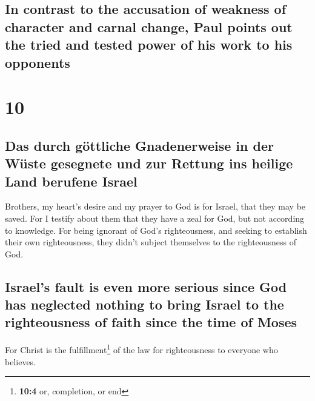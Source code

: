 \hypertarget{in-contrast-to-the-accusation-of-weakness-of-character-and-carnal-change-paul-points-out-the-tried-and-tested-power-of-his-work-to-his-opponents}{%
\subsection{In contrast to the accusation of weakness of character and
carnal change, Paul points out the tried and tested power of his work to
his
opponents}\label{in-contrast-to-the-accusation-of-weakness-of-character-and-carnal-change-paul-points-out-the-tried-and-tested-power-of-his-work-to-his-opponents}}

\hypertarget{section-9}{%
\section{10}\label{section-9}}

\hypertarget{das-durch-guxf6ttliche-gnadenerweise-in-der-wuxfcste-gesegnete-und-zur-rettung-ins-heilige-land-berufene-israel}{%
\subsection{Das durch göttliche Gnadenerweise in der Wüste gesegnete und
zur Rettung ins heilige Land berufene
Israel}\label{das-durch-guxf6ttliche-gnadenerweise-in-der-wuxfcste-gesegnete-und-zur-rettung-ins-heilige-land-berufene-israel}}

 Brothers, my heart's desire and my prayer to God is for
Israel, that they may be saved.  For I testify about them
that they have a zeal for God, but not according to knowledge.
 For being ignorant of God's righteousness, and seeking to
establish their own righteousness, they didn't subject themselves to the
righteousness of God.

\hypertarget{israels-fault-is-even-more-serious-since-god-has-neglected-nothing-to-bring-israel-to-the-righteousness-of-faith-since-the-time-of-moses}{%
\subsection{Israel's fault is even more serious since God has neglected
nothing to bring Israel to the righteousness of faith since the time of
Moses}\label{israels-fault-is-even-more-serious-since-god-has-neglected-nothing-to-bring-israel-to-the-righteousness-of-faith-since-the-time-of-moses}}

 For Christ is the fulfillment\footnote{\textbf{10:4} or,
  completion, or end} of the law for righteousness to everyone who
believes.


